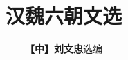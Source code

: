 \documentclass[a4paper, 12pt, openright]{ctexbook} %
\begin{document}
\frontmatter

\title{\Huge \textbf{汉魏六朝文选}}
\author{\textbf{【中】刘文忠}\quad 选编}
\date{}

\maketitle



\tableofcontents

\mainmatter




\end{document}
